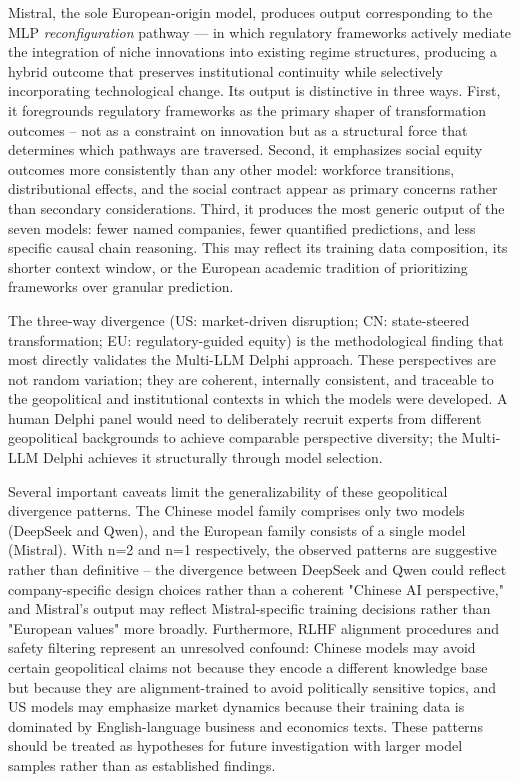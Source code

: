 \documentclass[preprint,review,12pt]{elsarticle}
\begin{document}
Mistral, the sole European-origin model, produces output corresponding to the MLP \textit{reconfiguration} pathway --- in which regulatory frameworks actively mediate the integration of niche innovations into existing regime structures, producing a hybrid outcome that preserves institutional continuity while selectively incorporating technological change. Its output is distinctive in three ways. First, it foregrounds regulatory frameworks as the primary shaper of transformation outcomes -- not as a constraint on innovation but as a structural force that determines which pathways are traversed. Second, it emphasizes social equity outcomes more consistently than any other model: workforce transitions, distributional effects, and the social contract appear as primary concerns rather than secondary considerations. Third, it produces the most generic output of the seven models: fewer named companies, fewer quantified predictions, and less specific causal chain reasoning. This may reflect its training data composition, its shorter context window, or the European academic tradition of prioritizing frameworks over granular prediction.

The three-way divergence (US: market-driven disruption; CN: state-steered transformation; EU: regulatory-guided equity) is the methodological finding that most directly validates the Multi-LLM Delphi approach. These perspectives are not random variation; they are coherent, internally consistent, and traceable to the geopolitical and institutional contexts in which the models were developed. A human Delphi panel would need to deliberately recruit experts from different geopolitical backgrounds to achieve comparable perspective diversity; the Multi-LLM Delphi achieves it structurally through model selection.

Several important caveats limit the generalizability of these geopolitical divergence patterns. The Chinese model family comprises only two models (DeepSeek and Qwen), and the European family consists of a single model (Mistral). With n=2 and n=1 respectively, the observed patterns are suggestive rather than definitive -- the divergence between DeepSeek and Qwen could reflect company-specific design choices rather than a coherent "Chinese AI perspective," and Mistral's output may reflect Mistral-specific training decisions rather than "European values" more broadly. Furthermore, RLHF alignment procedures and safety filtering represent an unresolved confound: Chinese models may avoid certain geopolitical claims not because they encode a different knowledge base but because they are alignment-trained to avoid politically sensitive topics, and US models may emphasize market dynamics because their training data is dominated by English-language business and economics texts. These patterns should be treated as hypotheses for future investigation with larger model samples rather than as established findings.
\end{document}
